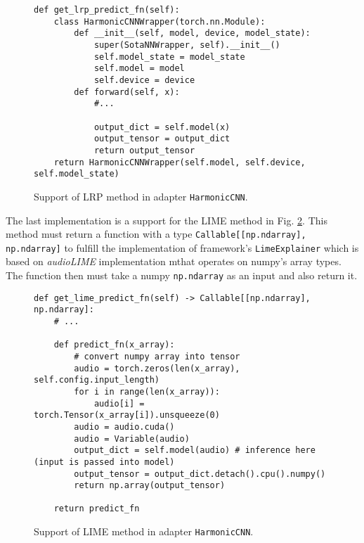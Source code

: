 \documentclass[
    bindingoffset=5mm,  %
    footnoteindent=3mm, %
    hyphenation=true    %
]{src/wut-thesis}
\begin{document}
\begin{figure}%
\begin{verbatim}
def get_lrp_predict_fn(self):
    class HarmonicCNNWrapper(torch.nn.Module):
        def __init__(self, model, device, model_state):
            super(SotaNNWrapper, self).__init__()
            self.model_state = model_state
            self.model = model 
            self.device = device
        def forward(self, x):
            #...

            output_dict = self.model(x)
            output_tensor = output_dict
            return output_tensor
    return HarmonicCNNWrapper(self.model, self.device, self.model_state)
\end{verbatim}
\caption{Support of LRP method in adapter \texttt{HarmonicCNN}.}
\label{fig:HarmonicLrpOverload}
\end{figure}

The last implementation is a support for the LIME method in Fig. \ref{fig:HarmonicLLIMEOverload}.
This method must return a function with a type \texttt{Callable[[np.ndarray], np.ndarray]}
to fulfill the implementation of framework’s \texttt{LimeExplainer} which is based on \textit{audioLIME}
implementation mthat operates on numpy’s array types. The function then must
take a numpy \texttt{np.ndarray} as an input and also return it.

\begin{figure}%
\begin{verbatim}
def get_lime_predict_fn(self) -> Callable[[np.ndarray], np.ndarray]:
    # ...

    def predict_fn(x_array):
        # convert numpy array into tensor
        audio = torch.zeros(len(x_array), self.config.input_length)
        for i in range(len(x_array)):
            audio[i] = torch.Tensor(x_array[i]).unsqueeze(0)
        audio = audio.cuda()
        audio = Variable(audio)
        output_dict = self.model(audio) # inference here (input is passed into model)
        output_tensor = output_dict.detach().cpu().numpy()
        return np.array(output_tensor)

    return predict_fn
\end{verbatim}
\caption{Support of LIME method in adapter \texttt{HarmonicCNN}.}
\label{fig:HarmonicLLIMEOverload}
\end{figure}
\end{document}
